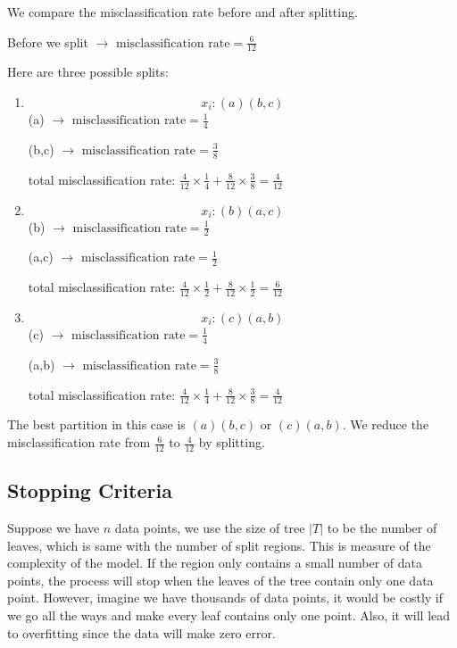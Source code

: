 \documentclass{article}
\begin{document}
{{	We compare the misclassification rate before and after splitting.
	
	Before we split  $\rightarrow$ \(\text{misclassification rate}=\frac{6}{12}\)
	
	Here are three possible splits:
	
	\begin{enumerate}
		\item  \[x_i:(a)(b,c)\]
		(a) $\rightarrow$ \(\text{misclassification rate}=\frac{1}{4}\)
		
		(b,c) $\rightarrow$ \(\text{misclassification rate}=\frac{3}{8}\)
		
		total misclassification rate: \(\frac{4}{12}\times\frac{1}{4}+\frac{8}{12}\times\frac{3}{8}=\frac{4}{12}\)
		
		\item  \[x_i:(b)(a,c)\] 
		(b) $\rightarrow$ \(\text{misclassification rate}=\frac{1}{2}\)
		
		(a,c) $\rightarrow$ \(\text{misclassification rate}=\frac{1}{2}\)
		
		total misclassification rate: \(\frac{4}{12}\times\frac{1}{2}+\frac{8}{12}\times\frac{1}{2}=\frac{6}{12}\)
		
		\item  \[x_i:(c)(a,b)\] 
		(c) $\rightarrow$ \(\text{misclassification rate}=\frac{1}{4}\)
		
		(a,b) $\rightarrow$ \(\text{misclassification rate}=\frac{3}{8}\)
		
		total misclassification rate: \(\frac{4}{12}\times\frac{1}{4}+\frac{8}{12}\times\frac{3}{8}=\frac{4}{12}\)
	\end{enumerate}
	
	The best partition in this case is $(a)(b,c)$ or $(c)(a,b)$. We reduce the misclassification rate from $\frac{6}{12}$ to $\frac{4}{12}$ by splitting.

\subsection{Stopping Criteria}
 Suppose we have $n$ data points, we use the size of tree $|T|$ to be the number of leaves, which is same with the number of split regions. This is measure of the complexity of the model. If the region only contains a small number of data points, the process will stop when the leaves of the tree contain only one data point. However, imagine we have thousands of data points, it would be costly if we go all the ways and make every leaf contains only one point. Also, it will lead to overfitting since the data will make zero error. 
	
}}
\end{document}
